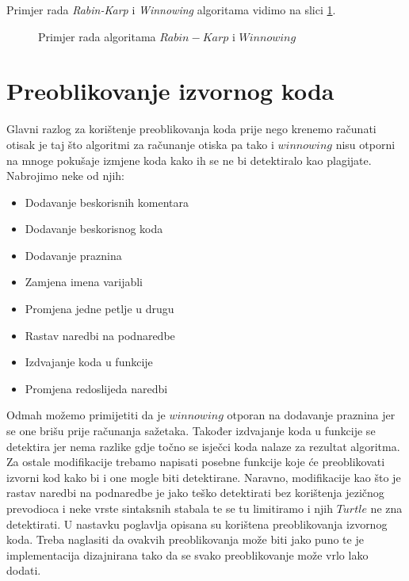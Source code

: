 \noindent Primjer rada \textit{Rabin-Karp} i \textit{Winnowing} algoritama vidimo na slici \ref{fig:winnowing}.

\begin{figure}[htb]
	\centering
	\caption{Primjer rada algoritama $Rabin-Karp$ i $Winnowing$}
	\label{fig:winnowing}
\end{figure}


\section{Preoblikovanje izvornog koda}

Glavni razlog za korištenje preoblikovanja koda prije nego krenemo računati otisak je taj što algoritmi za računanje otiska pa tako i $winnowing$ nisu otporni na mnoge pokušaje izmjene koda kako ih se ne bi detektiralo kao plagijate. Nabrojimo neke od njih:

	\begin{itemize}
		\item Dodavanje beskorisnih komentara
		\item Dodavanje beskorisnog koda
		\item Dodavanje praznina
		\item Zamjena imena varijabli
		\item Promjena jedne petlje u drugu
		\item Rastav naredbi na podnaredbe
		\item Izdvajanje koda u funkcije
		\item Promjena redoslijeda naredbi
	\end{itemize}
	
\noindent Odmah možemo primijetiti da je $winnowing$ otporan na dodavanje praznina jer se one brišu prije računanja sažetaka. Također izdvajanje koda u funkcije se detektira jer nema razlike gdje točno se isječci koda nalaze za rezultat algoritma. Za ostale modifikacije trebamo napisati posebne funkcije koje će preoblikovati izvorni kod kako bi i one mogle biti detektirane. Naravno, modifikacije kao što je rastav naredbi na podnaredbe  je jako teško detektirati bez korištenja jezičnog prevodioca i neke vrste sintaksnih stabala te se tu limitiramo i njih $Turtle$ ne zna detektirati. U nastavku poglavlja opisana su korištena preoblikovanja izvornog koda. Treba naglasiti da ovakvih preoblikovanja može biti jako puno te je implementacija dizajnirana tako da se svako preoblikovanje može vrlo lako dodati.


